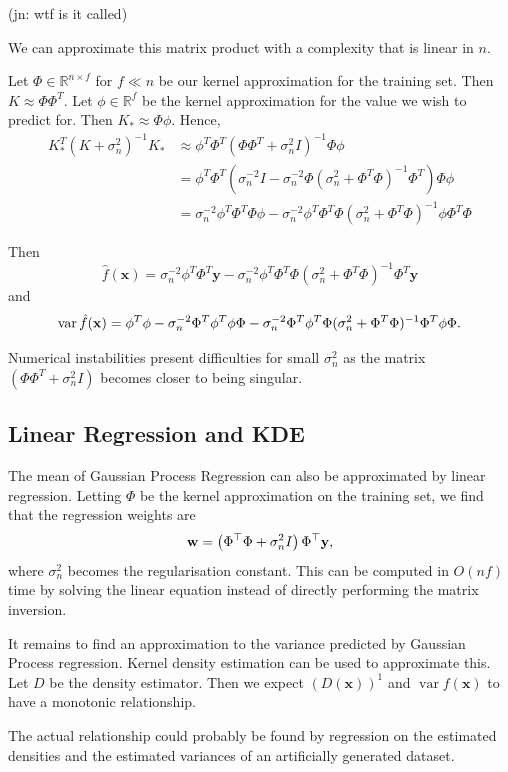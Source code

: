 \documentclass[11pt,twoside]{report}
\newcommand\bbR{\mathbb{R}}
\newcommand\bw{\mathbf{w}}
\newcommand\bx{\mathbf{x}}
\newcommand\by{\mathbf{y}}
\DeclareMathOperator{\var}{var}
\newcommand\jn[1]{{\color{red}(jn: #1)}}
\begin{document}
\jn{wtf is it called}

We can approximate this matrix product with a complexity that is linear in $n$.

Let $\Phi \in \bbR^{n \times f}$ for $f \ll n$ be our kernel approximation for the training set. Then $K \approx \Phi \Phi^T$. Let $\phi \in \bbR^{f}$ be the kernel approximation for the value we wish to predict for. Then $K_* \approx \Phi \phi$. Hence,\begin{align*}
    K_*^T(K+\sigma_n^2)^{-1}K_* &\approx \phi^T\Phi^T  \left(\Phi \Phi^T + \sigma_n^2I\right)^{-1} \Phi\phi \\
    &= \phi^T\Phi^T  \left( \sigma_n^{-2}I - \sigma_n^{-2}\Phi(\sigma_n^{2} + \Phi^T\Phi)^{-1}\Phi^T\right) \Phi\phi \\
    &=  \sigma_n^{-2}\phi^T\Phi^T\Phi\phi - \sigma_n^{-2}\phi^T\Phi^T \Phi(\sigma_n^{2} + \Phi^T\Phi)^{-1}\phi\Phi^T\Phi
\end{align*}

Then \[
    \hat f(\bx) = \sigma_n^{-2} \phi^T\Phi^T\by - \sigma_n^{-2} \phi^T\Phi^T\Phi(\sigma_n^{2} + \Phi^T\Phi)^{-1}\Phi^T\by
\] and \[
    \var \hat f(\bx) = \phi^T\phi - \sigma_n^{-2}\Phi^T \phi^T\phi\Phi - \sigma_n^{-2}\Phi^T \phi^T\Phi(\sigma_n^{2} + \Phi^T\Phi)^{-1}\Phi^T\phi\Phi\text.
\]

Numerical instabilities present difficulties for small $\sigma_n^2$ as the matrix $(\Phi\Phi^T + \sigma_n^2I)$ becomes closer to being singular.

\subsection{Linear Regression and KDE}

The mean of Gaussian Process Regression can also be approximated by linear regression. Letting $\Phi$ be the kernel approximation on the training set, we find that the regression weights are\[
    \bw = \left(\Phi^\top\Phi + \sigma_n^2 I\right) \Phi^\top\by\text,
\] where $\sigma_n^2$ becomes the regularisation constant. This can be computed in $O(nf)$ time by solving the linear equation instead of directly performing the matrix inversion.

It remains to find an approximation to the variance predicted by Gaussian Process regression. Kernel density estimation can be used to approximate this. Let $D$ be the density estimator. Then we expect $\left(D(\bx)\right)^1$ and $\var f(\bx)$ to have a monotonic relationship.

The actual relationship could probably be found by regression on the estimated densities and the estimated variances of an artificially generated dataset.
\end{document}
